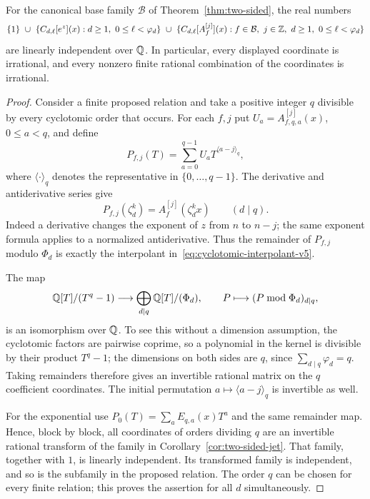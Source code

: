 \begin{theorem}
\label{thm:all-cyclotomic-v5}
For the canonical base family $\mathcal B$ of
Theorem~\ref{thm:two-sided}, the real numbers
\[
 \{1\}\ \cup\
 \{C_{d,\ell}[e^z](x):d\geq1,\ 0\leq\ell<\varphi_d\}
 \ \cup\
 \{C_{d,\ell}[A_f^{[j]}](x):
       f\in\mathcal B,\ j\in\mathbb Z,\ d\geq1,\
       0\leq\ell<\varphi_d\}
\]
are linearly independent over $\mathbb Q$.
In particular, every displayed coordinate is irrational, and every
nonzero finite rational combination of the coordinates is irrational.
\end{theorem}

\begin{proof}
Consider a finite proposed relation and take a positive integer $q$
divisible by every cyclotomic order that occurs.  For each $f,j$ put
$U_a=A_{f,q,a}^{[j]}(x)$, $0\leq a<q$, and define
\[
 P_{f,j}(T)=\sum_{a=0}^{q-1}U_a T^{\langle a-j\rangle_q},
\]
where $\langle\cdot\rangle_q$ denotes the representative in
$\{0,\ldots,q-1\}$.  The derivative and antiderivative series give
\[
 P_{f,j}(\zeta_d^k)=A_f^{[j]}(\zeta_d^k x)
 \qquad(d\mid q).
\]
Indeed a derivative changes the exponent of $z$ from $n$ to $n-j$;
the same exponent formula applies to a normalized antiderivative.
Thus the remainder of $P_{f,j}$ modulo $\Phi_d$ is exactly the
interpolant in~\eqref{eq:cyclotomic-interpolant-v5}.

The map
\[
 \mathbb Q[T]/(T^q-1)\longrightarrow
 \bigoplus_{d\mid q}\mathbb Q[T]/(\Phi_d),
 \qquad P\longmapsto(P\bmod\Phi_d)_{d\mid q},
\]
is an isomorphism over $\mathbb Q$.  To see this without a dimension
assumption, the cyclotomic factors are pairwise coprime, so a polynomial
in the kernel is divisible by their product $T^q-1$; the dimensions
on both sides are $q$, since $\sum_{d\mid q}\varphi_d=q$.
Taking remainders therefore gives an invertible rational matrix on
the $q$ coefficient coordinates.  The initial permutation
$a\mapsto\langle a-j\rangle_q$ is invertible as well.

For the exponential use $P_0(T)=\sum_a E_{q,a}(x)T^a$ and the same
remainder map.  Hence, block by block, all coordinates of orders
dividing $q$ are an invertible rational transform of the family in
Corollary~\ref{cor:two-sided-jet}.  That family, together with $1$,
is linearly independent.  Its transformed family is independent,
and so is the subfamily in the proposed relation.  The order $q$
can be chosen for every finite relation; this proves the assertion
for all $d$ simultaneously.
\end{proof}

